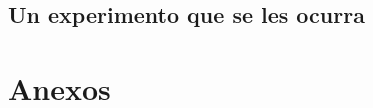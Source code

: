 \documentclass[journal]{IEEEtran}
\begin{document}
\subsection{Un experimento que se les ocurra}






\section*{Anexos}

    
\end{document}
